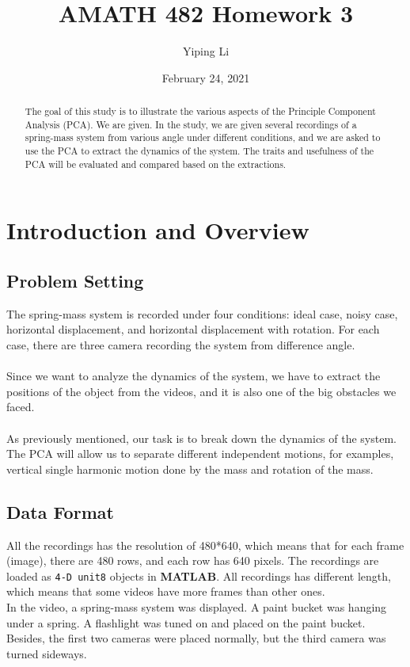 \documentclass{article}
\title{AMATH 482 Homework 3}
\author{Yiping Li}
\date{February 24, 2021}
\begin{document}
\maketitle

\begin{abstract}
    The goal of this study is to illustrate the various aspects of the Principle Component Analysis (PCA). We are given. In the study, we are given several recordings of a spring-mass system from various angle under different conditions, and we are asked to use the PCA to extract the dynamics of the system. The traits and usefulness of the PCA will be evaluated and compared based on the extractions.
\end{abstract}

\section{Introduction and Overview}
\subsection{Problem Setting}
The spring-mass system is recorded under four conditions: ideal case, noisy case, horizontal displacement, and horizontal displacement with rotation. For each case, there are three camera recording the system from difference angle. \\
~\\
Since we want to analyze the dynamics of the system, we have to extract the positions of the object from the videos, and it is also one of the big obstacles we faced. \\
~\\
As previously mentioned, our task is to break down the dynamics of the system. The PCA will allow us to separate different independent motions, for examples, vertical single harmonic motion done by the mass and rotation of the mass.
\subsection{Data Format}
All the recordings has the resolution of 480*640, which means that for each frame (image), there are 480 rows, and each row has 640 pixels. The recordings are loaded as \texttt{4-D unit8} objects in \textbf{MATLAB}. All recordings has different length, which means that some videos have more frames than other ones.
~\\
In the video, a spring-mass system was displayed. A paint bucket was hanging under a spring. A flashlight was tuned on and placed on the paint bucket. Besides, the first two cameras were placed normally, but the third camera was turned sideways.
\end{document}
